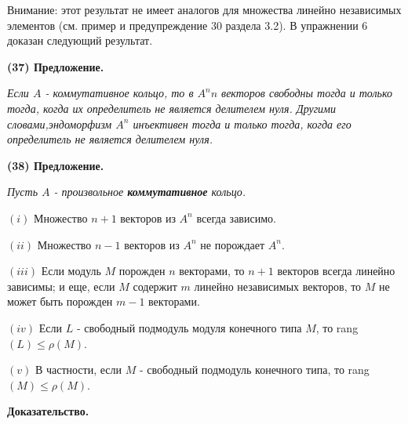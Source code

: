 \documentclass{mai_book}
\begin{document}
	Внимание: этот результат не имеет аналогов для множества линейно\linebreak
	независимых элементов (см. пример и предупреждение 30 раздела 3.2).\linebreak
	В упражнении 6 доказан следующий результат.
	
	\noindent
	{\bf (37) Предложение.}
	
	{\it Если $A$ - коммутативное кольцо, то в $A^n n$ векторов свободны\linebreak
	тогда и только тогда, когда их определитель не является делителем\linebreak
	нуля. Другими словами,эндоморфизм $A^n$ инъективен тогда и только\linebreak
	тогда, когда его определитель не является делителем нуля.}
	
	\noindent
	{\bf (38) Предложение.}
	
	{\it Пусть $A$ - произвольное {\bf коммутативное} кольцо.
		
	$(i)$ Множество $n + 1$ векторов из $A^n$ всегда зависимо.
	
	$(ii)$ Множество $n - 1$ векторов из $A^n$ не порождает $A^n$.
	
	$(iii)$ Если модуль $M$ порожден $n$ векторами, то $n + 1$ векторов всегда\linebreak
	линейно зависимы; и еще, если $M$ содержит $m$ линейно независимых\linebreak
	векторов, то $M$ не может быть порожден $m - 1$ векторами.
	
	$(iv)$ Если $L$ - свободный подмодуль модуля конечного типа $M$, то\linebreak
	rang$(L) \leqslant \rho(M)$.
	
	$(v)$ В частности, если $M$ - свободный подмодуль конечного типа,\linebreak
	то rang$(M) \leqslant \rho(M)$.}
	
	\pagebreak
	
	
	\noindent
	{\bf Доказательство.}
	
\end{document}
